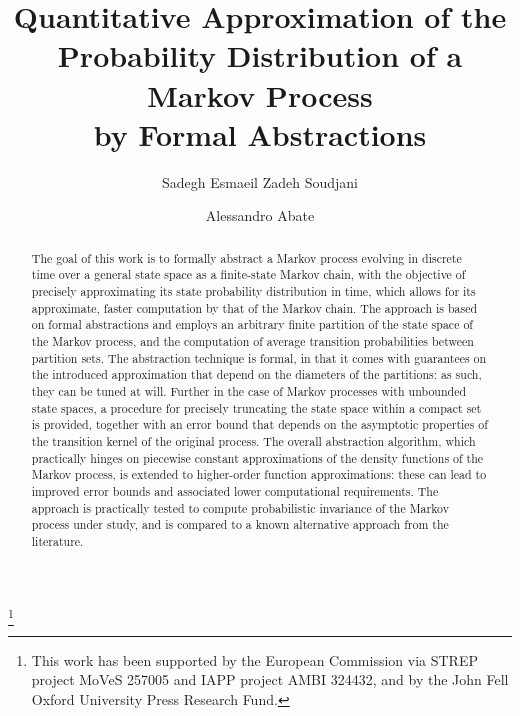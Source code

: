 \documentclass{LMCS}
\begin{document}
\title[Formal Abstractions of Continuous-Space Markov Processes]{
Quantitative Approximation of the\\ Probability Distribution
of a Markov Process\\ by Formal Abstractions\rsuper*
}

\author[S.~Esmaeil Zadeh Soudjani]{Sadegh Esmaeil Zadeh Soudjani}
\address{Department of Computer Science, University of Oxford, United Kingdom}

\author[A.~Abate]{Alessandro Abate}
\address{\vspace{-18 pt}}
\thanks{This work has been supported by the European Commission via STREP project MoVeS 257005 and IAPP project AMBI 324432, 
and by the John Fell Oxford University Press Research Fund.}




\begin{abstract}
\label{sec:abstract}
\noindent The goal of this work is to formally abstract a Markov process evolving in discrete time over a general state space as a finite-state Markov chain, 
with the objective of precisely approximating its state probability distribution 
in time, 
which allows for its approximate, faster computation by that of the Markov chain. 
The approach is based on formal abstractions and employs an arbitrary finite partition of the state space of the Markov process, 
and the computation of average transition probabilities between partition sets.
The abstraction technique is formal, 
in that it comes with guarantees on the introduced approximation that depend on the diameters of the partitions:  
as such, they can be tuned at will.  
Further in the case of Markov processes with unbounded state spaces, 
a procedure for precisely truncating the state space within a compact set is provided, 
together with an error bound that depends on the asymptotic properties of the transition kernel of the original process. 
The overall abstraction algorithm, 
which practically hinges on piecewise constant approximations of the density functions of the Markov process, 
is extended to higher-order function approximations:  
these can lead to improved error bounds and associated lower computational requirements.     
The approach is practically tested to compute probabilistic invariance of the Markov process under study, 
and is compared to a known alternative approach from the literature. 
\end{abstract}
\end{document}
